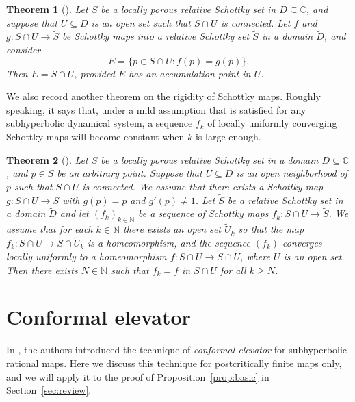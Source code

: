 \documentclass[12pt]{amsart}
\newtheorem{thm}{Theorem}[section]
\newcommand{\C}{\mathbb{C}}
\newcommand{\N}{\mathbb{N}}
\newcommand{\co}{\colon}
\begin{document}
\begin{thm}[\cite{Me2}]\label{thm:Un}
Let $S$ be a locally porous relative Schottky set in $D\subseteq \C$,  and suppose that $U\subseteq D$ is an open  set such that $S\cap U$ is connected. 
Let $f$ and $g\co  S\cap U\to \widetilde S$ be Schottky maps into a relative Schottky set $\widetilde S$ in a domain $\widetilde D$, and consider 
$$
E=\{p\in S\cap U\co f(p)=g(p)\}.
$$  
Then $E=S\cap U$, provided $E$ has an accumulation point in $U$. 
\end{thm} 
We also record another theorem \cite[Theorem 5.2]{Me2} on the rigidity of Schottky maps. Roughly speaking, it says that, under a mild assumption that is satisfied for any subhyperbolic dynamical system, a sequence $f_k$ of locally uniformly converging Schottky maps will become constant when $k$ is large enough. 
\begin{thm}[\cite{Me2}]\label{thm:Der}
Let $S$ be a locally porous relative Schottky set in a  domain $D\subseteq\C$, and $p\in S$ be an arbitrary point. 
Suppose that $U\subseteq D$ is an open neighborhood of $p$ such that $S\cap U$ is connected. We assume that there exists a Schottky map 
$g\co S\cap U\to S$ with $g(p)=p$ and $g'(p)\neq1$.
Let $\widetilde S$ be a relative Schottky set in a domain $\widetilde D$ and let $(f_k)_{k\in\N}$ be a sequence of Schottky maps $f_k\co S\cap U\to \widetilde S$.  We assume that for each $k\in\N$ there exists an open set $\widetilde U_k$ so that the map $f_k\co S\cap U\to \widetilde S\cap \widetilde U_k$ is a homeomorphism, and the sequence $(f_k)$
converges locally uniformly to a  homeomorphism $f\co S\cap U\to \widetilde S\cap\widetilde U$, where $\widetilde U$ is an open set. 
Then there exists $N\in \N$ such that $f_k=f$ in $S\cap U$ for all $k\geq N$.
\end{thm} 


\section{Conformal elevator}\label{sec:conformalelevator}
\noindent In \cite[Section 4]{BLM}, the authors introduced the technique of \textit{conformal elevator} for subhyperbolic rational maps. Here we discuss this technique for postcritically finite maps
only, and we will apply it to the proof of Proposition~\ref{prop:basic} in Section~\ref{sec:review}.
\end{document}
